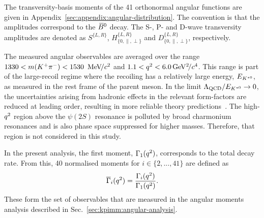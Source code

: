 The transversity-basis moments of the 41 orthonormal angular functions are given in Appendix~\ref{sec:appendix:angular-distribution}. The convention is that the amplitudes correspond to the ${{\kern 0.18em\overline{\kern -0.18em B}{}}{}^0}$ decay. The S-, P- and D-wave transversity amplitudes are denoted as $S^{\{L,R\}}$, $H^{\{L,R\}}_{\{0,\parallel,\perp\}}$ and $D^{\{L,R\}}_{\{0,\parallel,\perp\}}$, respectively. 

The measured angular observables are averaged over the range $1330<m({{K}^+}{{\pi}^-})<1530~{\mathrm{\,Me\kern -0.1em V\!/}c^2}$ and $1.1<{q^2}<6.0{\mathrm{\,Ge\kern -0.1em V^2\!/}c^4}$. This \qsq range is part of the large-recoil regime where the recoiling \Kstarz has a relatively large energy, $E_{{{K}^{*0}}}$, as measured in the rest frame of the parent \Bz meson. In the limit $\Lambda_{\rm QCD}/E_{{{K}^{*0}}} \rightarrow 0$, the uncertainties arising from hadronic effects in the relevant form-factors are reduced at leading order, resulting in more reliable theory predictions~\cite{DescotesGenon:2013wba}. The high-${q^2}$ region above the $\psi(2S)$ resonance is polluted by broad charmonium resonances and is also phase space suppressed for higher \mkpi masses. Therefore, that region is not considered in this study.

In the present analysis, the first moment, $\Gamma_{1}({q^2})$, corresponds to the total decay rate. From this, 40 normalised moments for $i \in \{2,...,41\}$ are defined as
\begin{equation}
\label{eqn:norm_mom_def}
\overline{\Gamma}_i({q^2}) = \frac{\Gamma_{i}({q^2})}{\Gamma_{1}({q^2})}.
\end{equation}
\noindent These form the set of observables that are measured in the angular moments analysis described in Sec.~\ref{sec:kpimm:angular-analysis}.